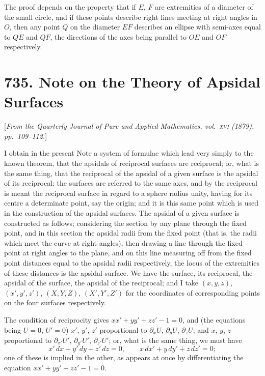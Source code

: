 \documentclass[11pt,a4paper]{book}
\begin{document}
The proof depends on the property that if $E$, $F$ are extremities of a
diameter of the small circle, and if these points describe right lines meeting
at right angles in $O$, then any point $Q$ on the diameter $EF$ describes
an ellipse with semi-axes equal to $QE$ and $QF$, the directions of the axes
being parallel to $OE$ and $OF$ respectively.

\newpage
\section*{735. Note on the Theory of Apsidal Surfaces}

[\textit{From the Quarterly Journal of Pure and Applied Mathematics, vol.~\textsc{xvi} (1879),
pp.~109--112.}]

I obtain in the present Note a system of formulae which lead very
simply to the known theorem, that the apsidals of reciprocal surfaces are
reciprocal; or, what is the same thing, that the reciprocal of the apsidal of
a given surface is the apsidal of its reciprocal; the surfaces are referred to
the same axes, and by the reciprocal is meant the reciprocal surface in
regard to a sphere radius unity, having for its centre a determinate point,
say the origin; and it is this same point which is used in the construction
of the apsidal surfaces. The apsidal of a given surface is constructed as
follows; considering the section by any plane through the fixed point, and
in this section the apsidal radii from the fixed point (that is, the radii which
meet the curve at right angles), then drawing a line through the fixed point
at right angles to the plane, and on this line measuring off from the fixed
point distances equal to the apsidal radii respectively, the locus of the
extremities of these distances is the apsidal surface. We have the surface,
its reciprocal, the apsidal of the surface, the apsidal of the reciprocal; and
I take $(x,y,z)$, $(x',y',z')$, $(X,Y,Z)$, $(X',Y',Z')$ for the coordinates of
corresponding points on the four surfaces respectively.

The condition of reciprocity gives $xx'+yy'+zz'-1=0$, and (the
equations being $U=0$, $U'=0$) $x'$, $y'$, $z'$ proportional to
$\partial_xU$, $\partial_yU$, $\partial_zU$; and $x$, $y$, $z$ proportional to
$\partial_{x'}U'$, $\partial_{y'}U'$, $\partial_{z'}U'$; or, what is the same thing,
we must have
\[
x'\,dx + y'\,dy + z'\,dz = 0,\qquad
x\,dx' + y\,dy' + z\,dz' = 0;
\]
one of these is implied in the other, as appears at once by differentiating
the equation $xx'+yy'+zz'-1=0$.
\end{document}
